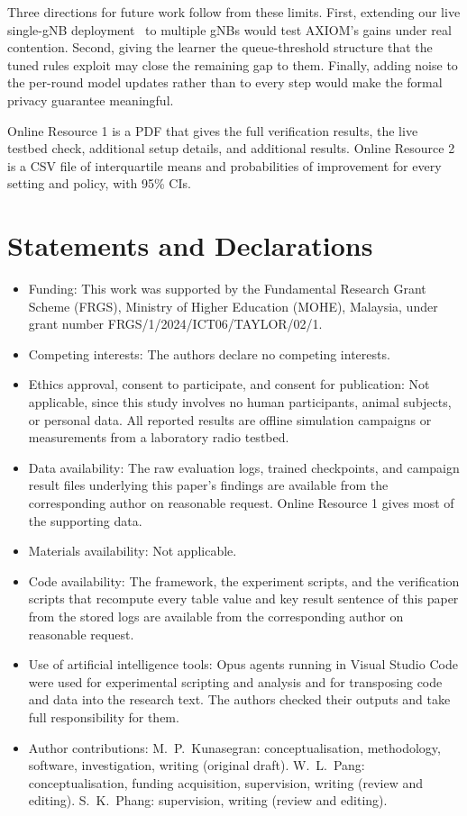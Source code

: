 \documentclass[pdflatex,sn-basic,Numbered]{sn-jnl}
\begin{document}
Three directions for future work follow from these limits. First, extending our live single-gNB deployment~\cite{cacs-paper4} to multiple gNBs would test AXIOM's gains under real contention. Second, giving the learner the queue-threshold structure that the tuned rules exploit may close the remaining gap to them. Finally, adding noise to the per-round model updates rather than to every step would make the formal privacy guarantee meaningful.

\backmatter

Online Resource 1 is a PDF that gives the full verification results, the live testbed check, additional setup details, and additional results. Online Resource 2 is a CSV file of interquartile means and probabilities of improvement for every setting and policy, with 95\% CIs.

\section*{Statements and Declarations}

\begin{itemize}
\item Funding: This work was supported by the Fundamental Research Grant Scheme (FRGS), Ministry of Higher Education (MOHE), Malaysia, under grant number FRGS/1/2024/ICT06/TAYLOR/02/1.
\item Competing interests: The authors declare no competing interests.
\item Ethics approval, consent to participate, and consent for publication: Not applicable, since this study involves no human participants, animal subjects, or personal data. All reported results are offline simulation campaigns or measurements from a laboratory radio testbed.
\item Data availability: The raw evaluation logs, trained checkpoints, and campaign result files underlying this paper's findings are available from the corresponding author on reasonable request. Online Resource 1 gives most of the supporting data.
\item Materials availability: Not applicable.
\item Code availability: The framework, the experiment scripts, and the verification scripts that recompute every table value and key result sentence of this paper from the stored logs are available from the corresponding author on reasonable request.
\item Use of artificial intelligence tools: Opus agents running in Visual Studio Code were used for experimental scripting and analysis and for transposing code and data into the research text. The authors checked their outputs and take full responsibility for them.
\item Author contributions: M.\ P.\ Kunasegran: conceptualisation, methodology, software, investigation, writing (original draft). W.\ L.\ Pang: conceptualisation, funding acquisition, supervision, writing (review and editing). S.\ K.\ Phang: supervision, writing (review and editing).
\end{itemize}


\end{document}
